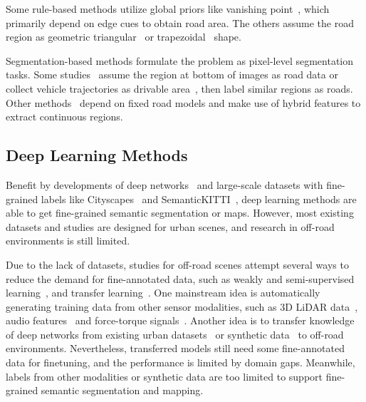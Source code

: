 \documentclass[letterpaper, 10 pt, conference]{ieeeconf}  %
\begin{document}
	Some rule-based methods utilize global priors like vanishing point~\cite{kong2009vanishing}\cite{shi2015fast}, which primarily depend on edge cues to obtain road area. The others assume the road region as geometric triangular~\cite{zhou2010self} or trapezoidal~\cite{jeong2002vision} shape.
	
	Segmentation-based methods formulate the problem as pixel-level segmentation tasks. Some studies~\cite{lu2014hierarchical}
	assume the region at bottom of images as road data or collect vehicle trajectories as drivable area~\cite{mei2017scene}, then label similar regions as roads.
	Other methods~\cite{alon2006off}\cite{wang2009unstructured} depend on fixed road models and make use of hybrid features to extract continuous regions.
	
	\subsection{Deep Learning Methods}
	Benefit by developments of deep networks~\cite{long2015fully} and large-scale datasets with fine-grained labels like Cityscapes~\cite{cordts2016cityscapes} and SemanticKITTI~\cite{behley2019semantickitti}, deep learning methods are able to get fine-grained semantic segmentation or maps. However, most existing datasets and studies are designed for urban scenes, and research in off-road environments is still limited.
	
	Due to the lack of datasets, studies for off-road scenes attempt several ways to reduce the demand for fine-annotated data, such as weakly and semi-supervised learning~\cite{suger2015traversability}\cite{gao2019off}, and transfer learning~\cite{holder2016road}\cite{sharma2019semantic}. 
	One mainstream idea is automatically generating training data from other sensor modalities, such as 3D LiDAR data~\cite{gao2019off}\cite{tang2017one}, audio features~\cite{zurn2020self} and force-torque signals~\cite{wellhausen2019should}.
	Another idea is to transfer knowledge of deep networks from existing urban datasets~\cite{holder2016road} or synthetic data~\cite{sharma2019semantic} to off-road environments.
	Nevertheless, transferred models still need some fine-annotated data for finetuning, and the performance is limited by domain gaps. Meanwhile, labels from other modalities or synthetic data are too limited to support fine-grained semantic segmentation and mapping.
	
\end{document}
